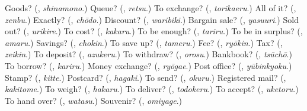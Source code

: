 \begin{tcolorbox}[breakable,colback=teal!4,colframe=teal!35!black,title={Before you move on}]
Goods? (\textbf{}, \emph{shinamono}.) Queue? (\textbf{}, \emph{retsu}.) To exchange? (\textbf{}, \emph{torikaeru}.) All of it? (\textbf{}, \emph{zenbu}.) Exactly? (\textbf{}, \emph{chōdo}.) Discount? (\textbf{}, \emph{waribiki}.) Bargain sale? (\textbf{}, \emph{yasuuri}.) Sold out? (\textbf{}, \emph{urikire}.) To cost? (\textbf{}, \emph{kakaru}.) To be enough? (\textbf{}, \emph{tariru}.) To be in surplus? (\textbf{}, \emph{amaru}.) Savings? (\textbf{}, \emph{chokin}.) To save up? (\textbf{}, \emph{tameru}.) Fee? (\textbf{}, \emph{ryōkin}.) Tax? (\textbf{}, \emph{zeikin}.) To deposit? (\textbf{}, \emph{azukeru}.) To withdraw? (\textbf{}, \emph{orosu}.) Bankbook? (\textbf{}, \emph{tsūchō}.) To borrow? (\textbf{}, \emph{kariru}.) Money exchange? (\textbf{}, \emph{ryōgae}.) Post office? (\textbf{}, \emph{yūbinkyoku}.) Stamp? (\textbf{}, \emph{kitte}.) Postcard? (\textbf{}, \emph{hagaki}.) To send? (\textbf{}, \emph{okuru}.) Registered mail? (\textbf{}, \emph{kakitome}.) To weigh? (\textbf{}, \emph{hakaru}.) To deliver? (\textbf{}, \emph{todokeru}.) To accept? (\textbf{}, \emph{uketoru}.) To hand over? (\textbf{}, \emph{watasu}.) Souvenir? (\textbf{}, \emph{omiyage}.)
\end{tcolorbox}
